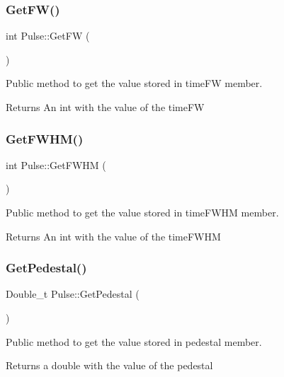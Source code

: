 \subsubsection{\texorpdfstring{Get\+F\+W()}{GetFW()}}
{\footnotesize\ttfamily int Pulse\+::\+Get\+FW (\begin{DoxyParamCaption}{ }\end{DoxyParamCaption})}



Public method to get the value stored in time\+FW member. 

\begin{DoxyReturn}{Returns}
An int with the value of the time\+FW 
\end{DoxyReturn}
\mbox{\label{classPulse_a726a4179243d4386a909e5d21b2b1c9f}} 
\subsubsection{\texorpdfstring{Get\+F\+W\+H\+M()}{GetFWHM()}}
{\footnotesize\ttfamily int Pulse\+::\+Get\+F\+W\+HM (\begin{DoxyParamCaption}{ }\end{DoxyParamCaption})}



Public method to get the value stored in time\+F\+W\+HM member. 

\begin{DoxyReturn}{Returns}
An int with the value of the time\+F\+W\+HM 
\end{DoxyReturn}
\mbox{\label{classPulse_a40819da67d9c6494b0171c32d4b5ea42}} 
\subsubsection{\texorpdfstring{Get\+Pedestal()}{GetPedestal()}}
{\footnotesize\ttfamily Double\+\_\+t Pulse\+::\+Get\+Pedestal (\begin{DoxyParamCaption}{ }\end{DoxyParamCaption})}



Public method to get the value stored in pedestal member. 

\begin{DoxyReturn}{Returns}
a double with the value of the pedestal 
\end{DoxyReturn}
\mbox{\label{classPulse_ad1c6b05032aaae9972b80566e5cd7c35}} 
